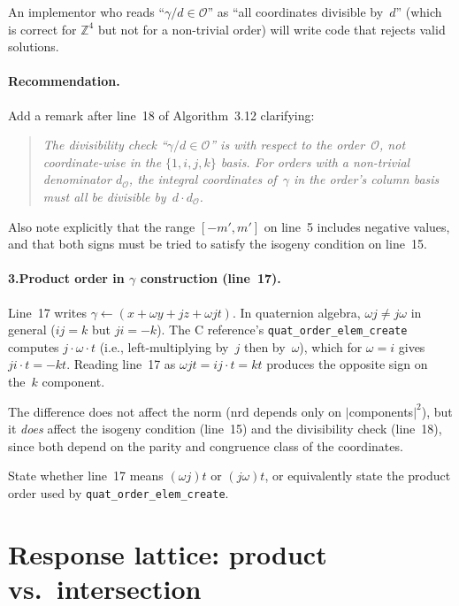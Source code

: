 \documentclass[a4paper,11pt]{article}
\newcommand{\algo}[1]{Algorithm~#1}
\begin{document}
An implementor who reads ``$\gamma / d \in \mathcal{O}$'' as
``all coordinates divisible by~$d$'' (which is correct for
$\mathbb{Z}^4$ but not for a non-trivial order) will write code
that rejects valid solutions.

\paragraph{Recommendation.}
Add a remark after line~18 of \algo{3.12} clarifying:
\begin{quote}
  \itshape The divisibility check ``$\gamma / d \in \mathcal{O}$''
  is with respect to the order~$\mathcal{O}$, not
  coordinate-wise in the $\{1, i, j, k\}$ basis.  For orders with
  a non-trivial denominator $d_{\mathcal{O}}$, the integral
  coordinates of~$\gamma$ in the order's column basis must all be
  divisible by~$d \cdot d_{\mathcal{O}}$.
\end{quote}
Also note explicitly that the range $[-m', m']$ on line~5 includes
negative values, and that both signs must be tried to satisfy the
isogeny condition on line~15.

\paragraph{3.\enspace Product order in $\gamma$ construction
(line~17).}
Line~17 writes $\gamma \leftarrow (x + \omega y + jz + \omega jt)$.
In quaternion algebra, $\omega j \neq j\omega$ in general ($ij = k$
but $ji = -k$).  The C reference's
\texttt{quat\_order\_elem\_create} computes $j \cdot \omega \cdot t$
(i.e., left-multiplying by~$j$ then by~$\omega$), which for
$\omega = i$ gives $ji \cdot t = -kt$.  Reading line~17 as
$\omega j t = ij \cdot t = kt$ produces the opposite sign on
the~$k$ component.

The difference does not affect the norm ($\mathrm{nrd}$ depends only
on $|$components$|^2$), but it \emph{does} affect the isogeny
condition (line~15) and the divisibility check (line~18), since both
depend on the parity and congruence class of the coordinates.

State whether line~17 means $(\omega j)t$ or $(j\omega)t$, or
equivalently state the product order used by
\texttt{quat\_order\_elem\_create}.

\section{Response lattice: product vs.\ intersection}
\label{sec:response-lattice}
\end{document}
